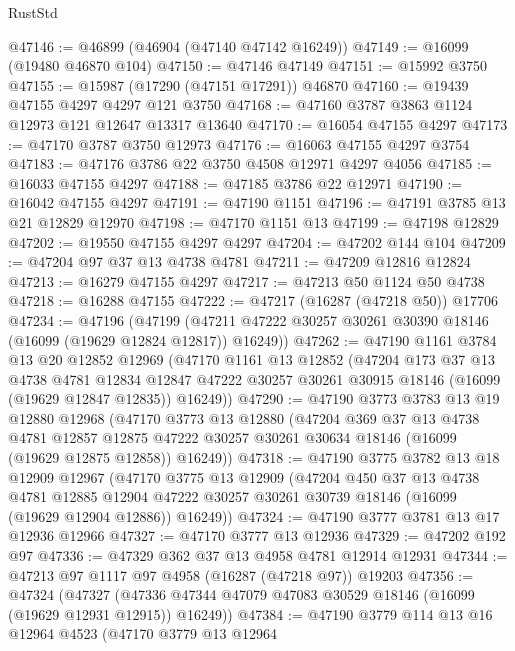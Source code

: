 \begin{lexlean}{RustStd}
\begin{coremodule}
@47146 := @46899 (@46904 (@47140 @47142 @16249))
@47149 := @16099 (@19480 @46870 @104)
@47150 := @47146 @47149
@47151 := @15992 @3750
@47155 := @15987 (@17290 (@47151 @17291)) @46870
@47160 := @19439 @47155 @4297 @4297 @121 @3750
@47168 := @47160 @3787 @3863 @1124 @12973 @121 @12647 @13317 @13640
@47170 := @16054 @47155 @4297
@47173 := @47170 @3787 @3750 @12973
@47176 := @16063 @47155 @4297 @3754
@47183 := @47176 @3786 @22 @3750 @4508 @12971 @4297 @4056
@47185 := @16033 @47155 @4297
@47188 := @47185 @3786 @22 @12971
@47190 := @16042 @47155 @4297
@47191 := @47190 @1151
@47196 := @47191 @3785 @13 @21 @12829 @12970
@47198 := @47170 @1151 @13
@47199 := @47198 @12829
@47202 := @19550 @47155 @4297 @4297
@47204 := @47202 @144 @104
@47209 := @47204 @97 @37 @13 @4738 @4781
@47211 := @47209 @12816 @12824
@47213 := @16279 @47155 @4297
@47217 := @47213 @50 @1124 @50 @4738
@47218 := @16288 @47155
@47222 := @47217 (@16287 (@47218 @50)) @17706
@47234 := @47196
    (@47199 (@47211 @47222 @30257 @30261 @30390 @18146 (@16099 (@19629 @12824 @12817)) @16249))
@47262 := @47190
    @1161
    @3784
    @13
    @20
    @12852
    @12969
    (@47170
      @1161
      @13
      @12852
      (@47204
        @173
        @37
        @13
        @4738
        @4781
        @12834
        @12847
        @47222
        @30257
        @30261
        @30915
        @18146
        (@16099 (@19629 @12847 @12835))
        @16249))
@47290 := @47190
    @3773
    @3783
    @13
    @19
    @12880
    @12968
    (@47170
      @3773
      @13
      @12880
      (@47204
        @369
        @37
        @13
        @4738
        @4781
        @12857
        @12875
        @47222
        @30257
        @30261
        @30634
        @18146
        (@16099 (@19629 @12875 @12858))
        @16249))
@47318 := @47190
    @3775
    @3782
    @13
    @18
    @12909
    @12967
    (@47170
      @3775
      @13
      @12909
      (@47204
        @450
        @37
        @13
        @4738
        @4781
        @12885
        @12904
        @47222
        @30257
        @30261
        @30739
        @18146
        (@16099 (@19629 @12904 @12886))
        @16249))
@47324 := @47190 @3777 @3781 @13 @17 @12936 @12966
@47327 := @47170 @3777 @13 @12936
@47329 := @47202 @192 @97
@47336 := @47329 @362 @37 @13 @4958 @4781 @12914 @12931
@47344 := @47213 @97 @1117 @97 @4958 (@16287 (@47218 @97)) @19203
@47356 := @47324
    (@47327 (@47336 @47344 @47079 @47083 @30529 @18146 (@16099 (@19629 @12931 @12915)) @16249))
@47384 := @47190
    @3779
    @114
    @13
    @16
    @12964
    @4523
    (@47170
      @3779
      @13
      @12964

\end{coremodule}
\end{lexlean}
